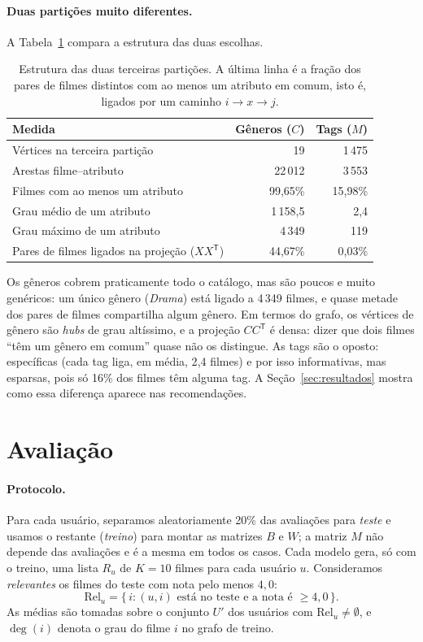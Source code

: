 \documentclass[12pt,a4paper]{article}
\theoremstyle{definition}
\begin{document}
\paragraph{Duas partições muito diferentes.}
A Tabela~\ref{tab:particoes} compara a estrutura das duas escolhas.

\begin{table}[ht]
\centering
\begin{tabular}{lrr}
\toprule
Medida & Gêneros ($C$) & Tags ($M$) \\
\midrule
Vértices na terceira partição & 19 & 1\,475 \\
Arestas filme--atributo & 22\,012 & 3\,553 \\
Filmes com ao menos um atributo & 99{,}65\% & 15{,}98\% \\
Grau médio de um atributo & 1\,158{,}5 & 2{,}4 \\
Grau máximo de um atributo & 4\,349 & 119 \\
Pares de filmes ligados na projeção ($XX^{\mathsf T}$) & 44{,}67\% & 0{,}03\% \\
\bottomrule
\end{tabular}
\caption{Estrutura das duas terceiras partições. A última linha é a
fração dos pares de filmes distintos com ao menos um atributo em comum,
isto é, ligados por um caminho $i \to x \to j$.}
\label{tab:particoes}
\end{table}

Os gêneros cobrem praticamente todo o catálogo, mas são poucos e muito
genéricos: um único gênero (\emph{Drama}) está ligado a 4\,349 filmes, e
quase metade dos pares de filmes compartilha algum gênero. Em termos do
grafo, os vértices de gênero são \emph{hubs} de grau altíssimo, e a
projeção $CC^{\mathsf T}$ é densa: dizer que dois filmes ``têm um gênero
em comum'' quase não os distingue. As tags são o oposto: específicas
(cada tag liga, em média, 2{,}4 filmes) e por isso informativas, mas
esparsas, pois só 16\% dos filmes têm alguma tag. A
Seção~\ref{sec:resultados} mostra como essa diferença aparece nas
recomendações.

\section{Avaliação}\label{sec:avaliacao}

\paragraph{Protocolo.}
Para cada usuário, separamos aleatoriamente 20\% das avaliações para
\emph{teste} e usamos o restante (\emph{treino}) para montar as matrizes
$B$ e $W$; a matriz $M$ não depende das avaliações e é a mesma em todos
os casos. Cada modelo gera, só com o treino, uma lista $R_u$ de $K = 10$
filmes para cada usuário $u$. Consideramos \emph{relevantes} os filmes do
teste com nota pelo menos $4{,}0$:
\[
  \mathrm{Rel}_u = \{\, i : (u, i) \text{ está no teste e a nota é } \geq 4{,}0 \,\}.
\]
As médias são tomadas sobre o conjunto $U'$ dos usuários com
$\mathrm{Rel}_u \neq \emptyset$, e $\deg(i)$ denota o grau do filme $i$ no
grafo de treino.
\end{document}

